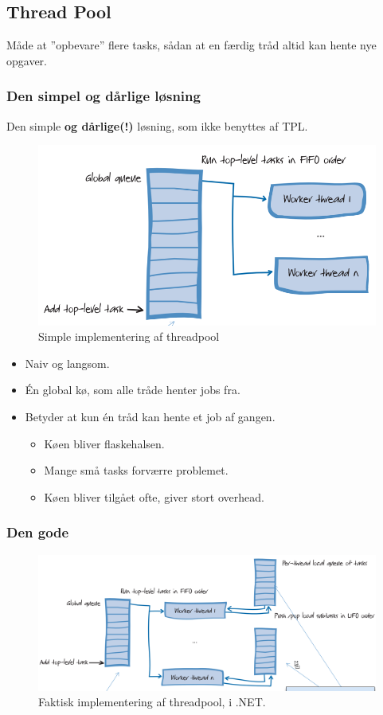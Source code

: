 \subsection{Thread Pool}
Måde at ''opbevare'' flere tasks, sådan at en færdig tråd altid kan hente nye opgaver.

\subsubsection{Den simpel og dårlige løsning}
Den simple \textbf{og dårlige(!)} løsning, som ikke benyttes af TPL. 

\begin{figure}[h]
	\centering
	\includegraphics[width=0.7\linewidth]{figs/badthreadpool}
	\caption{Simple implementering af threadpool}
	\label{fig:badthreadpool}
\end{figure}


\begin{itemize}
	\item Naiv og langsom.
	\item Én global kø, som alle tråde henter jobs fra.
	\item Betyder at kun én tråd kan hente et job af gangen.
	\begin{itemize}
		\item Køen bliver flaskehalsen.
		\item Mange små tasks forværre problemet.
		\item Køen bliver tilgået ofte, giver stort overhead.
	\end{itemize}
\end{itemize}

\subsubsection{Den gode}

\begin{figure}[h]
	\centering
	\includegraphics[width=\linewidth]{figs/goodthreadpool}
	\caption{Faktisk implementering af threadpool, i .NET.}
	\label{fig:goodthreadpool}
\end{figure}

